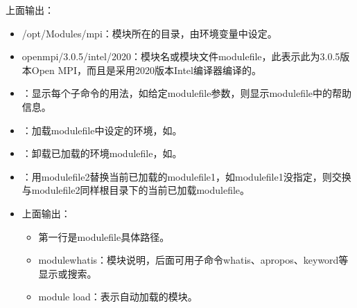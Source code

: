 \documentclass[a4paper,12pt,english]{sphinxmanual}
\begin{document}
\sphinxAtStartPar
上面输出：
\begin{itemize}
\item {} 
\sphinxAtStartPar
/opt/Modules/mpi：模块所在的目录，由环境变量中设定。

\item {} 
\sphinxAtStartPar
openmpi/3.0.5/intel/2020：模块名或模块文件modulefile，此表示此为3.0.5版本Open
MPI，而且是采用2020版本Intel编译器编译的。

\end{itemize}
\begin{itemize}
\item {} 
\sphinxAtStartPar
{}：显示每个子命令的用法，如给定modulefile参数，则显示modulefile中的帮助信息。

\item {} 
\sphinxAtStartPar
{}：加载modulefile中设定的环境，如。

\item {} 
\sphinxAtStartPar
{}：卸载已加载的环境modulefile，如。

\item {} 
\sphinxAtStartPar
{}：用modulefile2替换当前已加载的modulefile1，如modulefile1没指定，则交换与modulefile2同样根目录下的当前已加载modulefile。

\item {} 

\sphinxAtStartPar
上面输出：
\begin{itemize}
\item {} 
\sphinxAtStartPar
第一行是modulefile具体路径。

\item {} 
\sphinxAtStartPar
module\sphinxhyphen{}whatis：模块说明，后面可用子命令whatis、apropos、keyword等显示或搜索。

\item {} 
\sphinxAtStartPar
module load：表示自动加载的模块。


\end{itemize}
\end{itemize}
\end{document}
